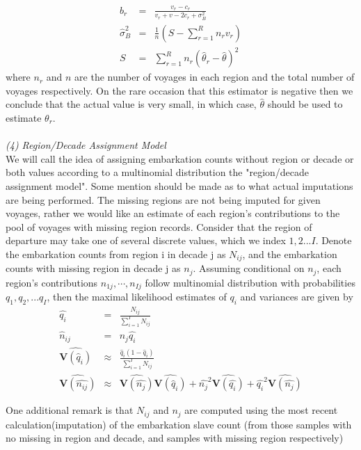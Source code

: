 \documentclass[preprint,12pt]{elsarticle}
\begin{document}
\begin{eqnarray}
b_r &=& \frac{v_r - c_r}{v_r + v - 2c_r + \sigma_B^2}\\
\hat{\sigma}_B^2 &=& \frac{1}{n}(S - \sum_{r=1}^R n_r v_r)\\
S &=& \sum_{r=1}^R n_r (\hat{\theta}_r - \hat{\theta})^2
\end{eqnarray}
where $n_r$ and $n$ are the number of voyages in each region and the
total number of voyages respectively. 
On the rare occasion that this estimator is negative then we conclude
that the actual value is very small, in which case, $\hat{\theta}$
should be used to estimate $\theta_r$.\\
\\
\textit{(4) Region/Decade Assignment Model}\\
\indent
We will call the idea of assigning embarkation counts without region or
decade or both values according to a multinomial distribution the "region/decade
assignment model".
Some mention should be made as to what actual imputations are being performed.
The missing regions are not being imputed for given voyages, rather we would like an estimate of each region's contributions to the pool of voyages with missing region records. Consider that the  region of departure may take one of several discrete values, which we index $1,2...I$.
Denote the embarkation counts from region i in decade j as $N_{ij}$,
 and the  embarkation counts with missing region in decade j as $n_j$. Assuming conditional on $n_j$,  each region's contributions $n_{1j},\cdots,n_{Ij} $ follow multinomial distribution with probabilities $q_1,q_2,...q_I$, then the maximal likelihood estimates of $q_i$  and variances are 
given by
\begin{eqnarray}
\hat{q_i}&=&\frac{N_{ij}}{\sum_{i=1} ^{I}{N_{ij}}}\\
\hat{n}_{ij}&=&n_j \hat{q_i} \\
\widehat{\mathbf{V}(\hat{q}_i)} &\approx& \frac{\hat{q}_i(1 - \hat{q}_i)}{\sum_{i=1} ^{I}{N_{ij}}} \\
\widehat{\mathbf{V}(\hat{n_{ij}})}&\approx& \widehat{\mathbf{V}(\hat{n_j})} \widehat{\mathbf{V}(\hat{q}_i)} + \hat{n_j}^2\widehat{\mathbf{V}(\hat{q_i})}+\hat{q_i}^2\widehat{\mathbf{V}(\hat{n_j})}
\end{eqnarray}
\par
One additional remark is that $N_{ij}$ and $n_j$ are computed using the most recent calculation(imputation) of the embarkation slave count (from those samples with no missing in region and 
decade, and samples with missing region respectively)\\
\end{document}
